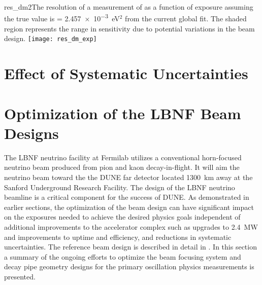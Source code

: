 \begin{cdrfigure}{res_dm2}{The resolution of a measurement of  as a function of exposure assuming the true value is  = \num{2.457e-3}~eV$^2$ from the current global fit. The shaded region represents the range in sensitivity due to potential variations in the beam design.  }
 \texttt{[image: res\_dm\_exp]}
\end{cdrfigure}

\section{Effect of Systematic Uncertainties}
\label{sec:physics-lbnosc-beamnd-req}

\section{Optimization of the LBNF Beam Designs}
\label{sec:physics-lbnosc-beam}

The LBNF neutrino facility at Fermilab utilizes a conventional
horn-focused neutrino beam produced from pion and kaon
decay-in-flight. It will aim the neutrino beam toward the the DUNE far
detector located \num{1300}~km away at the Sanford Underground Research
Facility.  The design of the LBNF neutrino beamline is a critical
component for the success of DUNE. As demonstrated in earlier
sections, the optimization of the beam design can have significant
impact on the exposures needed to achieve the desired physics goals
independent of additional improvements to the accelerator complex such
as upgrades to 2.4~MW and improvements to uptime and efficiency, and
reductions in systematic uncertainties. The reference beam design is
described in detail in \vollbnf. In this section a summary of the
ongoing efforts to optimize the beam focusing system and decay pipe
geometry designs for the primary oscillation physics measurements is
presented.

